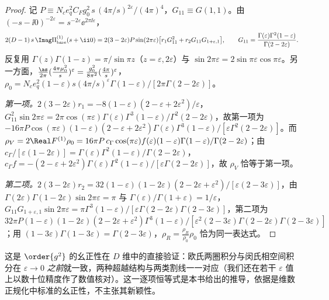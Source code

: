 \begin{proof}
记 $P\equiv N_ce_q^2C_Fg_0^2\,s\,(4\pi/s)^{2\varepsilon}/(4\pi)^4$，$G_{11}\equiv G(1,1)$。由 $(-s-\ii0)^{-2\varepsilon}=s^{-2\varepsilon}\ee^{2\pi\ii\varepsilon}$，
\[
2(D-1)\,s\,\Imag\Pi^{(1)}_{\rm bare}(s+\ii0)=2(3-2\varepsilon)P\sin(2\pi\varepsilon)\big[r_1G_{11}^2+r_2G_{11}G_{1+\varepsilon,1}\big],\qquad G_{11}=\frac{\Gamma(\varepsilon)\Gamma^2(1-\varepsilon)}{\Gamma(2-2\varepsilon)} .
\]反复用 $\Gamma(z)\Gamma(1-z)=\pi/\sin\pi z$（$z=\varepsilon,2\varepsilon$）与 $\sin2\pi\varepsilon=2\sin\pi\varepsilon\cos\pi\varepsilon$。另一方面，$\frac{\as}{2\pi}(\frac{4\pi\mu_0^2}{s})^\varepsilon=\frac{g_0^2}{8\pi^2}(\frac{4\pi}s)^\varepsilon$，$\rho_0=N_ce_q^2(1-\varepsilon)s(4\pi/s)^\varepsilon\Gamma(1-\varepsilon)/[2\pi\Gamma(2-2\varepsilon)]$。

\emph{第一项。}$2(3-2\varepsilon)r_1=-8(1-\varepsilon)(2-\varepsilon+2\varepsilon^2)/\varepsilon$，$G_{11}^2\sin2\pi\varepsilon=2\pi\cos(\pi\varepsilon)\Gamma(\varepsilon)\Gamma^3(1-\varepsilon)/\Gamma^2(2-2\varepsilon)$，故第一项为 $-16\pi P\cos(\pi\varepsilon)(1-\varepsilon)(2-\varepsilon+2\varepsilon^2)\Gamma(\varepsilon)\Gamma^3(1-\varepsilon)/[\varepsilon\Gamma^2(2-2\varepsilon)]$。而 $\rho_V=2\Real F^{(1)}\rho_0=16\pi P\,c_\Gamma\cos(\pi\varepsilon)f(\varepsilon)(1-\varepsilon)\Gamma(1-\varepsilon)/\Gamma(2-2\varepsilon)$；由 $c_\Gamma/[\varepsilon(1-2\varepsilon)]=\Gamma(\varepsilon)\Gamma^2(1-\varepsilon)/\Gamma(2-2\varepsilon)$，$c_\Gamma f=-(2-\varepsilon+2\varepsilon^2)\Gamma(\varepsilon)\Gamma^2(1-\varepsilon)/[\varepsilon\Gamma(2-2\varepsilon)]$，故 $\rho_V$ 恰等于第一项。

\emph{第二项。}$2(3-2\varepsilon)r_2=32(1-\varepsilon)(1-2\varepsilon)(2-2\varepsilon+\varepsilon^2)/[\varepsilon(2-3\varepsilon)]$，由 $\Gamma(2\varepsilon)\Gamma(1-2\varepsilon)\sin2\pi\varepsilon=\pi$ 与 $\Gamma(\varepsilon)/\Gamma(1+\varepsilon)=1/\varepsilon$，$G_{11}G_{1+\varepsilon,1}\sin2\pi\varepsilon=\pi\Gamma^3(1-\varepsilon)/[\varepsilon\Gamma(2-2\varepsilon)\Gamma(2-3\varepsilon)]$，第二项为 $32\pi P(1-\varepsilon)(1-2\varepsilon)(2-2\varepsilon+\varepsilon^2)\Gamma^3(1-\varepsilon)/[\varepsilon^2(2-3\varepsilon)\Gamma(2-2\varepsilon)\Gamma(2-3\varepsilon)]$；用 $(1-3\varepsilon)\Gamma(1-3\varepsilon)=\Gamma(2-3\varepsilon)$，$\rho_R=\frac{\rho_R}{\rho_0}\rho_0$ 恰为同一表达式。
\end{proof}
这是 $\order{g^2}$ 的幺正性在 $D$ 维中的直接验证：欧氏两圈积分与闵氏相空间积分在 $\varepsilon\to0$ \emph{之前}就一致，两种超越结构与两类割线一一对应（我们还在若干 $\varepsilon$ 值上以数十位精度作了数值核对）。这一逐项恒等式是本书给出的推导，依据是维数正规化中标准的幺正性\cite{Cutkosky1960,Veltman1963,tHooftVeltman1974}，不主张其新颖性。


